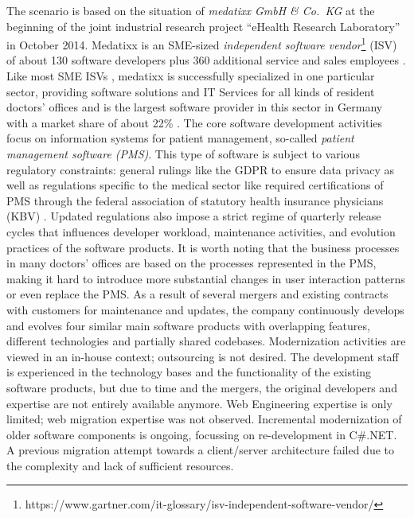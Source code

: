 The scenario is based on the situation of \emph{medatixx GmbH \& Co.~KG} at the beginning of the joint industrial research project ``eHealth Research Laboratory'' in October 2014.
Medatixx is an SME-sized \emph{independent software vendor}\footnote{https://www.gartner.com/it-glossary/isv-independent-software-vendor/} (ISV) of about 130 software developers plus 360 additional service and sales employees \autocite{Medatixx2018}.
Like most SME ISVs \autocite{Rose2016InnovationSME}, medatixx is successfully specialized in one particular sector, providing software solutions and IT Services for all kinds of resident doctors' offices and is the largest software provider in this sector in Germany with a market share of about 22\% \autocite{Medatixx2018}.
The core software development activities focus on information systems for patient management, so-called \emph{patient management software (PMS)}.
This type of software is subject to various regulatory constraints: general rulings like the GDPR to ensure data privacy \autocite{GDPR2016} as well as regulations specific to the medical sector like required certifications of PMS through the federal association of statutory health insurance physicians (KBV) \autocite{KBV2018}.
Updated regulations also impose a strict regime of quarterly release cycles that influences developer workload, maintenance activities, and evolution practices of the software products.
It is worth noting that the business processes in many doctors' offices are based on the processes represented in the PMS, making it hard to introduce more substantial changes in user interaction patterns or even replace the PMS.
As a result of several mergers and existing contracts with customers for maintenance and updates, the company continuously develops and evolves four similar main software products with overlapping features, different technologies and partially shared codebases.
Modernization activities are viewed in an in-house context; outsourcing is not desired.
The development staff is experienced in the technology bases and the functionality of the existing software products, but due to time and the mergers, the original developers and expertise are not entirely available anymore.
Web Engineering expertise is only limited; web migration expertise was not observed.
Incremental modernization of older software components is ongoing, focussing on re-development in C\#.NET.
A previous migration attempt towards a client/server architecture failed due to the complexity and lack of sufficient resources.

